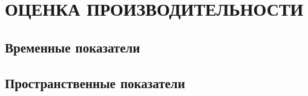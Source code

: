 \chapter{ОЦЕНКА ПРОИЗВОДИТЕЛЬНОСТИ}

\section{Временные показатели}
\section{Пространственные показатели}
